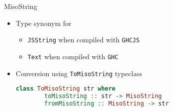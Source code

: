 \documentclass{beamer}
\begin{document}
\begin{frame}[fragile]{MisoString}
  \begin{itemize}
  \item Type synonym for
    \begin{itemize}
    \item \texttt{JSString} when compiled with \texttt{GHCJS}
    \item \texttt{Text} when compiled with \texttt{GHC}
    \end{itemize}
  \item Conversion using \texttt{ToMisoString} typeclass
    \begin{lstlisting}[language=Haskell]
      class ToMisoString str where
        toMisoString :: str -> MisoString
        fromMisoString :: MisoString -> str
    \end{lstlisting}
  \end{itemize}
\end{frame}
\end{document}
